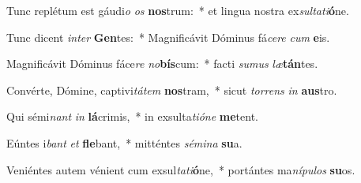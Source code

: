 \item Tunc replétum est gáudi\textit{o} \textit{os} \textbf{nos}trum:~* et lingua nostra ex\textit{sul}\textit{ta}\textit{ti}\textbf{ó}ne.
\item Tunc dicent \textit{in}\textit{ter} \textbf{Gen}tes:~* Magnificávit Dóminus fá\textit{ce}\textit{re} \textit{cum} \textbf{e}is.
\item Magnificávit Dóminus fáce\textit{re} \textit{no}\textbf{bís}cum:~* facti \textit{su}\textit{mus} \textit{læ}\textbf{tán}tes.
\item Convérte, Dómine, captivi\textit{tá}\textit{tem} \textbf{nos}tram,~* sicut \textit{tor}\textit{rens} \textit{in} \textbf{aus}tro.
\item Qui sémi\textit{nant} \textit{in} \textbf{lá}crimis,~* in exsulta\textit{ti}\textit{ó}\textit{ne} \textbf{me}tent.
\item Eúntes i\textit{bant} \textit{et} \textbf{fle}bant,~* mitténtes \textit{sé}\textit{mi}\textit{na} \textbf{su}a.
\item Veniéntes autem vénient cum exsul\textit{ta}\textit{ti}\textbf{ó}ne,~* portántes ma\textit{ní}\textit{pu}\textit{los} \textbf{su}os.
